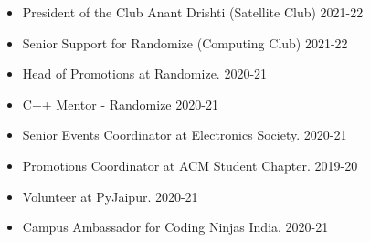 \documentclass[10pt,a4paper,ragged2e]{altacv}
\begin{document}

\begin{itemize}
    \item President of the Club Anant Drishti (Satellite Club) 2021-22
    \item Senior Support for Randomize (Computing Club) 2021-22
    \item Head of Promotions at Randomize. 2020-21
    \item C++ Mentor - Randomize 2020-21
    \item Senior Events Coordinator at Electronics Society. 2020-21
    \item Promotions Coordinator at ACM Student Chapter. 2019-20
    \item Volunteer at PyJaipur. 2020-21
    \item Campus Ambassador for Coding Ninjas India. 2020-21
   
\end{itemize}
\end{document}
